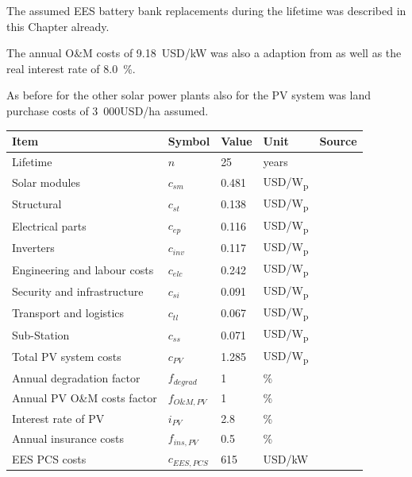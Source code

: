 The assumed EES battery bank replacements during the lifetime was described in this Chapter already.

The annual O\&M costs of 9.18~USD/kW was also a adaption from \cite{Zakeri2015} as well as the real interest rate of 8.0~\%.

As before for the other solar power plants also for the PV system was land purchase costs of 3~000USD/ha \cite{Cassell2012} assumed.
\pagebreak
\begin{table}[!h]  
  \centering
	\begin{tabular}{  p{5.4cm} C{1.5cm} C{1.5cm}  C{1.7cm}  C{4.0cm} } 
	\hline	
\textbf{Item} & \textbf{Symbol}& \textbf{Value} & \textbf{Unit} & \textbf{Source}\\ \hline \hline
Lifetime &$n$ & 25 & years & \cite{FraunhoferISE2013} \\ \hline
Solar modules & $c_{sm}$&0.481 & USD/W\textsubscript{p} & \cite{Terblanche2015}\\ 
Structural &$c_{st}$ &0.138 & USD/W\textsubscript{p} & \cite{Terblanche2015} \\ 
Electrical parts &$c_{ep}$ &0.116 & USD/W\textsubscript{p} & \cite{Terblanche2015} \\ 
Inverters&$c_{inv}$ &0.117 & USD/W\textsubscript{p} & \cite{Terblanche2015} \\ 
Engineering and labour costs & $c_{elc}$ & 0.242 & USD/W\textsubscript{p} & \cite{Terblanche2015} \\ 
Security and infrastructure & $c_{si}$& 0.091 & USD/W\textsubscript{p} & \cite{Terblanche2015} \\ 
Transport and logistics & $c_{tl}$& 0.067 & USD/W\textsubscript{p} & \cite{Terblanche2015}\\ 
Sub-Station & $c_{ss}$ & 0.071 & USD/W\textsubscript{p} &\cite{Terblanche2015} \\ \hline
Total PV system costs & $c_{PV}$ & 1.285 &  USD/W\textsubscript{p} &\cite{Terblanche2015} \\ 
Annual degradation factor &$f_{degrad}$ & 1 & \% & \cite{Tidball2010}\\ 
Annual PV O\&M costs factor &$f_{O\&M,PV}$ & 1 & \% & \cite{IEA2014a}\\
Interest rate of PV & $i_{PV}$& 2.8 & \% & \cite{FraunhoferISE2013} \\ 
Annual insurance costs & $f_{ins,PV}$ & 0.5 & \% & \cite{InternationalFinanceCorporation2015}\\ \hline
EES PCS costs & $c_{EES,PCS}$ & 615 & USD/kW & \cite{Zakeri2015} \\ 

\end{tabular}
\end{table}
